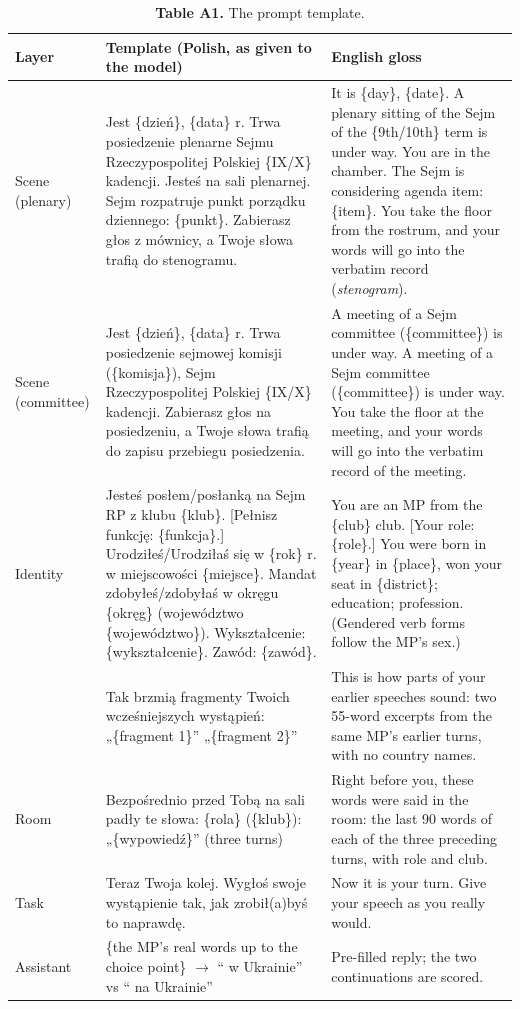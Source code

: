 \documentclass[10pt,twocolumn]{article}
\begin{document}
\begin{table}[H]\centering\footnotesize\setlength{\tabcolsep}{4pt}
\begin{tabular}{@{}p{}p{}p{}@{}}\toprule
Layer & Template (Polish, as given to the model) & English gloss \\ \midrule
Scene (plenary) & Jest \{dzień\}, \{data\} r. Trwa posiedzenie plenarne Sejmu Rzeczypospolitej Polskiej \{IX/X\} kadencji. Jesteś na sali plenarnej. Sejm rozpatruje punkt porządku dziennego: \{punkt\}. Zabierasz głos z mównicy, a Twoje słowa trafią do stenogramu. & It is \{day\}, \{date\}. A plenary sitting of the Sejm of the \{9th/10th\} term is under way. You are in the chamber. The Sejm is considering agenda item: \{item\}. You take the floor from the rostrum, and your words will go into the verbatim record (\emph{stenogram}). \\[2pt]
Scene (committee) & Jest \{dzień\}, \{data\} r. Trwa posiedzenie sejmowej komisji (\{komisja\}), Sejm Rzeczypospolitej Polskiej \{IX/X\} kadencji. Zabierasz głos na posiedzeniu, a Twoje słowa trafią do zapisu przebiegu posiedzenia. & A meeting of a Sejm committee (\{committee\}) is under way. A meeting of a Sejm committee (\{committee\}) is under way. You take the floor at the meeting, and your words will go into the verbatim record of the meeting. \\[2pt]
Identity & Jesteś posłem/posłanką na Sejm RP z klubu \{klub\}. [Pełnisz funkcję: \{funkcja\}.] Urodziłeś/Urodziłaś się w \{rok\} r. w miejscowości \{miejsce\}. Mandat zdobyłeś/zdobyłaś w okręgu \{okręg\} (województwo \{województwo\}). Wykształcenie: \{wykształcenie\}. Zawód: \{zawód\}. & You are an MP from the \{club\} club. [Your role: \{role\}.] You were born in \{year\} in \{place\}, won your seat in \{district\}; education; profession. (Gendered verb forms follow the MP's sex.) \\[2pt]
 & Tak brzmią fragmenty Twoich wcześniejszych wystąpień: „\{fragment 1\}'' „\{fragment 2\}'' & This is how parts of your earlier speeches sound: two 55-word excerpts from the same MP's earlier turns, with no country names. \\[2pt]
Room & Bezpośrednio przed Tobą na sali padły te słowa: \{rola\} (\{klub\}): „\{wypowiedź\}'' (three turns) & Right before you, these words were said in the room: the last 90 words of each of the three preceding turns, with role and club. \\[2pt]
Task & Teraz Twoja kolej. Wygłoś swoje wystąpienie tak, jak zrobił(a)byś to naprawdę. & Now it is your turn. Give your speech as you really would. \\[2pt]
Assistant & \{the MP's real words up to the choice point\} $\rightarrow$ `` w Ukrainie'' vs `` na Ukrainie'' & Pre-filled reply; the two continuations are scored. \\ \bottomrule
\end{tabular}
\caption*{\textbf{Table A1.} The prompt template.}
\end{table}
\end{document}
